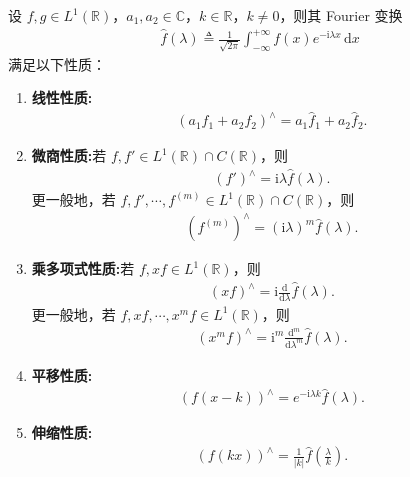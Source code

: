 \documentclass[../../main.tex]{subfiles}%
\begin{document}
\begin{proposition}\label{proposition:Fourier 变换的基本性质1}
设 $f,g\in L^1(\mathbb{R})$，$a_1,a_2\in\mathbb{C}$，$k\in\mathbb{R}$，$k\neq 0$，则其 Fourier 变换
\begin{align*}
\hat{f}(\lambda)\triangleq \frac{1}{\sqrt{2\pi}}\int_{-\infty}^{+\infty}f(x)e^{-\mathrm{i}\lambda x}\,\mathrm{d}x
\end{align*}
满足以下性质：
\begin{enumerate}[(1)]
\item\label{proposition:Fourier 变换的基本性质1-1} \textbf{线性性质:}
\begin{align*}
(a_1f_1+a_2f_2)^\wedge=a_1\hat{f}_1+a_2\hat{f}_2.
\end{align*}

\item\label{proposition:Fourier 变换的基本性质1-2} \textbf{微商性质:}若 $f,f'\in L^1(\mathbb{R})\cap C(\mathbb{R})$，则
\begin{align*}
(f')^\wedge=\mathrm{i}\lambda \hat{f}(\lambda).
\end{align*}
更一般地，若 $f,f',\cdots,f^{(m)}\in L^1(\mathbb{R})\cap C(\mathbb{R})$，则
\begin{align*}
(f^{(m)})^\wedge=(\mathrm{i}\lambda)^m\hat{f}(\lambda).
\end{align*}

\item\label{proposition:Fourier 变换的基本性质1-3} \textbf{乘多项式性质:}若 $f,xf\in L^1(\mathbb{R})$，则
\begin{align*}
(xf)^\wedge=\mathrm{i}\frac{\mathrm{d}}{\mathrm{d}\lambda}\hat{f}(\lambda).
\end{align*}
更一般地，若 $f,xf,\cdots,x^m f\in L^1(\mathbb{R})$，则
\begin{align*}
(x^m f)^\wedge=\mathrm{i}^m\frac{\mathrm{d}^m}{\mathrm{d}\lambda^m}\hat{f}(\lambda).
\end{align*}

\item\label{proposition:Fourier 变换的基本性质1-4} \textbf{平移性质:}
\begin{align*}
(f(x-k))^\wedge=e^{-\mathrm{i}\lambda k}\hat{f}(\lambda).
\end{align*}

\item\label{proposition:Fourier 变换的基本性质1-5} \textbf{伸缩性质:}
\begin{align*}
(f(kx))^\wedge=\frac{1}{|k|}\hat{f}\left(\frac{\lambda}{k}\right).
\end{align*}


\end{enumerate}
\end{proposition}
\end{document}

